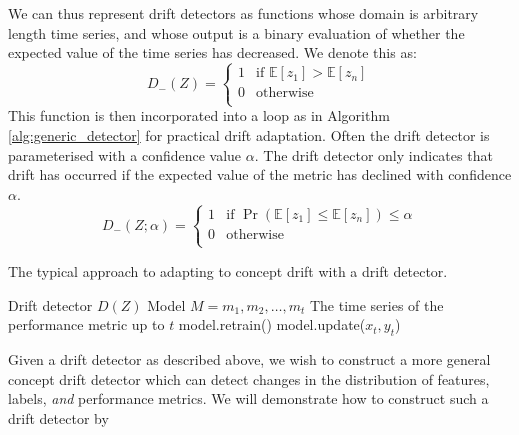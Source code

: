 We can thus represent drift detectors as functions whose domain is arbitrary length time series, and whose output is a binary evaluation of whether the expected value of the time series has decreased. We denote this as:
\begin{equation}
    D_-(Z) = 
    \begin{cases} 
        1 & \text{if $\mathbb{E}[z_1]>\mathbb{E}[z_n]$} \\
        0 & \text{otherwise} \\
    \end{cases} 
\end{equation}
This function is then incorporated into a loop as in Algorithm \ref{alg:generic_detector} for practical drift adaptation. Often the drift detector is parameterised with a confidence value $\alpha$. The drift detector only indicates that drift has occurred if the expected value of the metric has declined with confidence $\alpha$.  
\begin{equation}
    D_-(Z; \alpha) = 
    \begin{cases} 
        1 & \text{if $\Pr(\mathbb{E}[z_1]\le\mathbb{E}[z_n])\le \alpha$} \\
        0 & \text{otherwise} \\
    \end{cases} 
\end{equation}

\begin{algorithm}
    \caption{The typical approach to adapting to concept drift with a drift detector.}
    \label{alg:generic_detector}
    \begin{algorithmic}
        \Require Drift detector $D(Z)$
        \Require Model
            \State $M = m_1,m_2,\dots,m_t$
            \Comment The time series of the performance metric up to $t$
                \State model.retrain()
            \Else
                \State model.update($x_t,y_t$)
            \EndIf
        \EndFor
    \end{algorithmic}
\end{algorithm}

Given a drift detector as described above, we wish to construct a more general concept drift detector which can detect changes in the distribution of features, labels, {\it and} performance metrics. We will demonstrate how to construct such a drift detector by  

